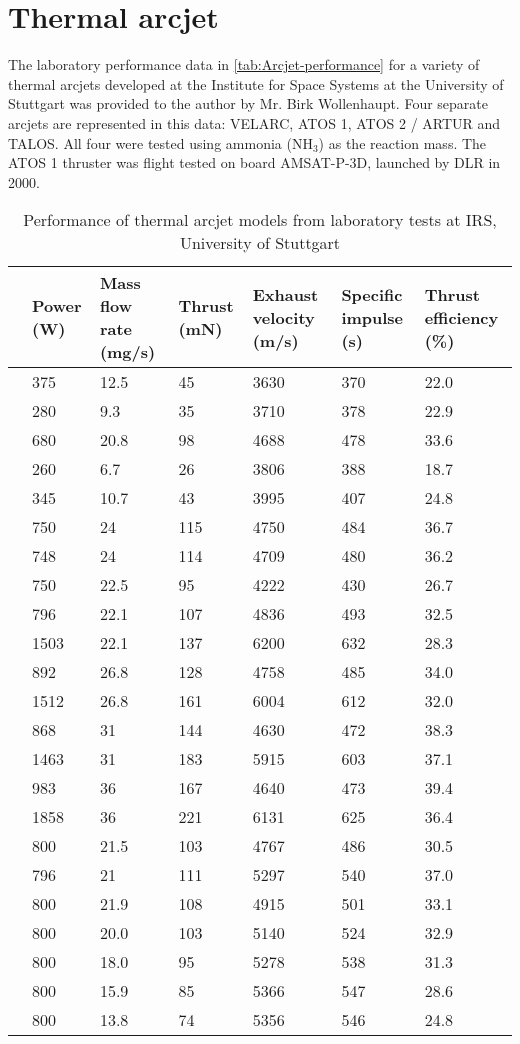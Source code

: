 \section{Thermal arcjet}\label{sec:Arcjet-characteristics}

The laboratory performance data in \autoref{tab:Arcjet-performance} for a variety of thermal arcjets developed at the Institute for Space Systems at the University of Stuttgart was provided to the author by Mr. Birk Wollenhaupt. Four separate arcjets are represented in this data: VELARC, ATOS 1, ATOS 2 / ARTUR and TALOS. All four were tested using ammonia (NH$_3$) as the reaction mass. The ATOS 1 thruster was flight tested on board AMSAT-P-3D, launched by DLR in 2000.

\begin{table}[h]
\caption{Performance of thermal arcjet models from laboratory tests at IRS, University of Stuttgart}
\label{tab:Arcjet-performance}
\begin{center}
\begin{tabular}{c C{0.09\textwidth} C{0.12\textwidth} C{0.1\textwidth} C{0.12\textwidth} C{0.12\textwidth} C{0.13\textwidth} }\toprule
& Power (W) & Mass flow rate (mg/s) & Thrust (mN) & Exhaust velocity (m/s) & Specific impulse (s) & Thrust efficiency (\%) \tabularnewline\midrule
& 375 & 12.5 & 45 & 3630 & 370 & 22.0 \tabularnewline
& 280 & 9.3 & 35 & 3710 & 378 & 22.9 \tabularnewline
& 680 & 20.8 & 98 & 4688 & 478 & 33.6 \tabularnewline
& 260 & 6.7 & 26 & 3806 & 388 & 18.7 \tabularnewline
& 345 & 10.7 & 43 & 3995 & 407 & 24.8 \tabularnewline\midrule
& 750 & 24 & 115 & 4750 & 484 & 36.7 \tabularnewline
& 748 & 24 & 114 & 4709 & 480 & 36.2 \tabularnewline
& 750 & 22.5 & 95 & 4222 & 430 & 26.7 \tabularnewline\midrule
& 796 & 22.1 & 107 & 4836 & 493 & 32.5 \tabularnewline
& 1503 & 22.1 & 137 & 6200 & 632 & 28.3 \tabularnewline
& 892 & 26.8 & 128 & 4758 & 485 & 34.0 \tabularnewline
& 1512 & 26.8 & 161 & 6004 & 612 & 32.0 \tabularnewline
& 868 & 31 & 144 & 4630 & 472 & 38.3 \tabularnewline
& 1463 & 31 & 183 & 5915 & 603 & 37.1 \tabularnewline
& 983 & 36 & 167 & 4640 & 473 & 39.4 \tabularnewline
& 1858 & 36 & 221 & 6131 & 625 & 36.4 \tabularnewline\midrule
& 800 & 21.5 & 103 & 4767 & 486 & 30.5 \tabularnewline
& 796 & 21 & 111 & 5297 & 540 & 37.0 \tabularnewline
& 800 & 21.9 & 108 & 4915 & 501 & 33.1 \tabularnewline
& 800 & 20.0 & 103 & 5140 & 524 & 32.9 \tabularnewline
& 800 & 18.0 &  95 & 5278 & 538 & 31.3 \tabularnewline
& 800 & 15.9 & 85 & 5366 & 547 & 28.6 \tabularnewline
& 800 & 13.8 & 74 & 5356 & 546 & 24.8 \tabularnewline\bottomrule
\end{tabular}
\end{center}
\end{table}

